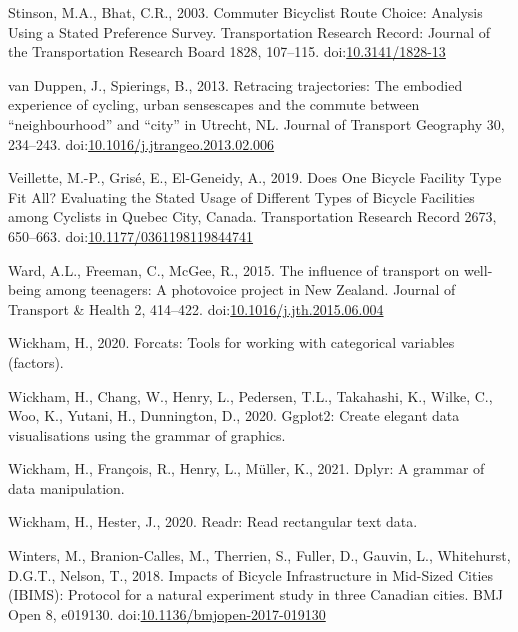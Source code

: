 \documentclass[]{elsarticle} %
\begin{document}
\leavevmode\hypertarget{ref-stinsonCommuterBicyclistRoute2003}{}%
Stinson, M.A., Bhat, C.R., 2003. Commuter Bicyclist Route Choice:
Analysis Using a Stated Preference Survey. Transportation Research
Record: Journal of the Transportation Research Board 1828, 107--115.
doi:\href{https://doi.org/10.3141/1828-13}{10.3141/1828-13}

\leavevmode\hypertarget{ref-vanduppenRetracingTrajectoriesEmbodied2013}{}%
van Duppen, J., Spierings, B., 2013. Retracing trajectories: The
embodied experience of cycling, urban sensescapes and the commute
between ``neighbourhood'' and ``city'' in Utrecht, NL. Journal of
Transport Geography 30, 234--243.
doi:\href{https://doi.org/10.1016/j.jtrangeo.2013.02.006}{10.1016/j.jtrangeo.2013.02.006}

\leavevmode\hypertarget{ref-veilletteDoesOneBicycle2019}{}%
Veillette, M.-P., Grisé, E., El-Geneidy, A., 2019. Does One Bicycle
Facility Type Fit All? Evaluating the Stated Usage of Different Types of
Bicycle Facilities among Cyclists in Quebec City, Canada. Transportation
Research Record 2673, 650--663.
doi:\href{https://doi.org/10.1177/0361198119844741}{10.1177/0361198119844741}

\leavevmode\hypertarget{ref-wardInfluenceTransportWellbeing2015}{}%
Ward, A.L., Freeman, C., McGee, R., 2015. The influence of transport on
well-being among teenagers: A photovoice project in New Zealand. Journal
of Transport \& Health 2, 414--422.
doi:\href{https://doi.org/10.1016/j.jth.2015.06.004}{10.1016/j.jth.2015.06.004}

\leavevmode\hypertarget{ref-R-forcats}{}%
Wickham, H., 2020. Forcats: Tools for working with categorical variables
(factors).

\leavevmode\hypertarget{ref-R-ggplot2}{}%
Wickham, H., Chang, W., Henry, L., Pedersen, T.L., Takahashi, K., Wilke,
C., Woo, K., Yutani, H., Dunnington, D., 2020. Ggplot2: Create elegant
data visualisations using the grammar of graphics.

\leavevmode\hypertarget{ref-R-dplyr}{}%
Wickham, H., François, R., Henry, L., Müller, K., 2021. Dplyr: A grammar
of data manipulation.

\leavevmode\hypertarget{ref-R-readr}{}%
Wickham, H., Hester, J., 2020. Readr: Read rectangular text data.

\leavevmode\hypertarget{ref-wintersImpactsBicycleInfrastructure2018}{}%
Winters, M., Branion-Calles, M., Therrien, S., Fuller, D., Gauvin, L.,
Whitehurst, D.G.T., Nelson, T., 2018. Impacts of Bicycle Infrastructure
in Mid-Sized Cities (IBIMS): Protocol for a natural experiment study in
three Canadian cities. BMJ Open 8, e019130.
doi:\href{https://doi.org/10.1136/bmjopen-2017-019130}{10.1136/bmjopen-2017-019130}
\end{document}
